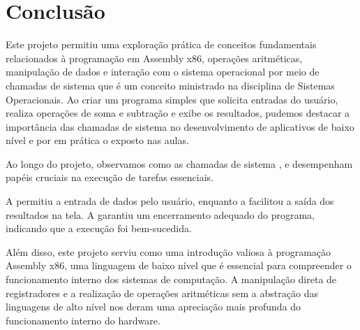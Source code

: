 \documentclass[
	12pt,				%
	openright,			%
	oneside,			%
	a4paper,			%
	chapter=TITLE,		%
	english,			%
	french,				%
	spanish,			%
	brazil				%
	]{abntex2}
\theoremstyle{definition}
\begin{document}
\chapter{Conclusão}
\label{conclusao}


Este projeto permitiu uma exploração prática de conceitos fundamentais relacionados 
à programação em Assembly x86, operações 
aritméticas, manipulação de dados e interação com o sistema operacional por meio de 
chamadas de sistema que é um conceito ministrado na disciplina de Sistemas Operacionais. 
Ao criar um programa simples que solicita
entradas do usuário, realiza operações de soma e subtração e exibe os resultados, 
pudemos destacar a importância das chamadas de sistema no 
desenvolvimento de aplicativos de baixo nível e por em prática o exposto nas aulas.

Ao longo do projeto, observamos como as chamadas de sistema 
, e 
desempenham papéis cruciais na execução de tarefas essenciais.
 
A  permitiu a entrada de dados pelo usuário, enquanto a  
facilitou a saída dos resultados na tela. A  garantiu um encerramento 
adequado do programa, indicando que a execução foi bem-sucedida.

Além disso, este projeto serviu como uma introdução valiosa à programação Assembly x86, uma 
linguagem de baixo nível que é essencial para compreender o funcionamento interno dos sistemas de 
computação. A manipulação direta de registradores e a realização de operações aritméticas sem a 
abstração das linguagens de alto nível nos deram uma apreciação mais profunda do 
funcionamento interno do hardware.


\postextual


\cite{tanenbaum2010sistemas}
\end{document}
